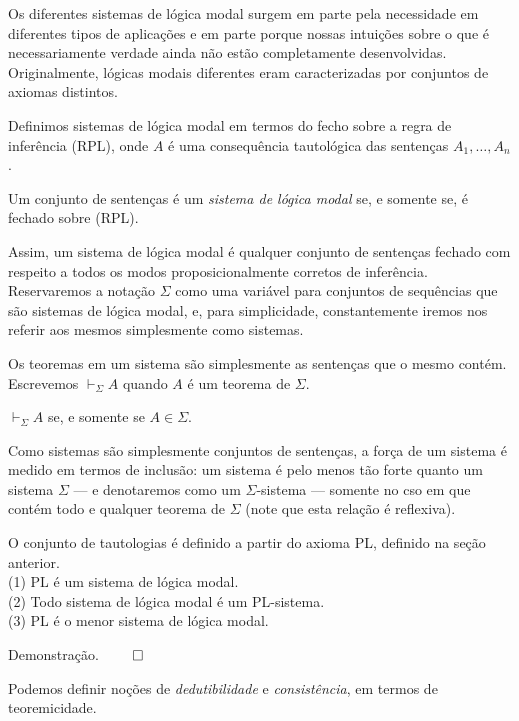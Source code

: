 Os diferentes sistemas de lógica modal surgem em parte pela necessidade em diferentes
tipos de aplicações e em parte porque nossas intuições sobre o que é necessariamente
verdade ainda não estão completamente desenvolvidas. Originalmente, lógicas
modais diferentes eram caracterizadas por conjuntos de axiomas distintos. 

Definimos sistemas de lógica modal em termos do fecho sobre a regra de
inferência (RPL), onde $A$ é uma consequência tautológica das sentenças $A_1,
\ldots, A_n$.

\begin{definition}
   Um conjunto de sentenças é um \textit{sistema de lógica modal} se, e somente
   se, é fechado sobre (RPL).
\end{definition}

Assim, um sistema de lógica modal é qualquer conjunto de sentenças fechado com
respeito a todos os modos proposicionalmente corretos de inferência.
Reservaremos a notação $\Sigma$ como uma variável para conjuntos de sequências
que são sistemas de lógica modal, e, para simplicidade, constantemente iremos
nos referir aos mesmos simplesmente como sistemas.

Os teoremas em um sistema são simplesmente as sentenças que o mesmo contém.
Escrevemos $\vdash_{\Sigma} A$ quando $A$ é um teorema de $\Sigma$.

\begin{definition}
    $\vdash_{\Sigma} A$ se, e somente se $A \in \Sigma$.
\end{definition}

Como sistemas são simplesmente conjuntos de sentenças, a força de um sistema é medido em
termos de inclusão: um sistema é pelo menos tão forte quanto um sistema $\Sigma$
--- e denotaremos como um $\Sigma$-sistema --- somente no cso em que contém todo
e qualquer teorema de $\Sigma$ (note que esta relação é reflexiva).

\begin{theorem}
    O conjunto de tautologias é definido a partir do axioma PL, definido na
    seção anterior.\\
    (1) PL é um sistema de lógica modal. \\
    (2) Todo sistema de lógica modal é um PL-sistema. \\
    (3) PL é o menor sistema de lógica modal.
\end{theorem}
Demonstração. $\qed$

Podemos definir noções de \textit{dedutibilidade} e \textit{consistência}, em
termos de teoremicidade. 

